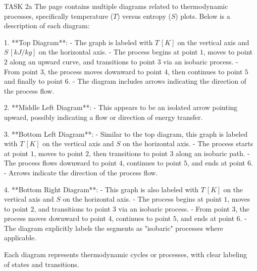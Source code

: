 TASK 2a  
The page contains multiple diagrams related to thermodynamic processes, specifically temperature (\( T \)) versus entropy (\( S \)) plots. Below is a description of each diagram:

1. **Top Diagram**:  
   - The graph is labeled with \( T \, [K] \) on the vertical axis and \( S \, [kJ/kg] \) on the horizontal axis.  
   - The process begins at point \( 1 \), moves to point \( 2 \) along an upward curve, and transitions to point \( 3 \) via an isobaric process.  
   - From point \( 3 \), the process moves downward to point \( 4 \), then continues to point \( 5 \) and finally to point \( 6 \).  
   - The diagram includes arrows indicating the direction of the process flow.  

2. **Middle Left Diagram**:  
   - This appears to be an isolated arrow pointing upward, possibly indicating a flow or direction of energy transfer.  

3. **Bottom Left Diagram**:  
   - Similar to the top diagram, this graph is labeled with \( T \, [K] \) on the vertical axis and \( S \) on the horizontal axis.  
   - The process starts at point \( 1 \), moves to point \( 2 \), then transitions to point \( 3 \) along an isobaric path.  
   - The process flows downward to point \( 4 \), continues to point \( 5 \), and ends at point \( 6 \).  
   - Arrows indicate the direction of the process flow.  

4. **Bottom Right Diagram**:  
   - This graph is also labeled with \( T \, [K] \) on the vertical axis and \( S \) on the horizontal axis.  
   - The process begins at point \( 1 \), moves to point \( 2 \), and transitions to point \( 3 \) via an isobaric process.  
   - From point \( 3 \), the process moves downward to point \( 4 \), continues to point \( 5 \), and ends at point \( 6 \).  
   - The diagram explicitly labels the segments as "isobaric" processes where applicable.  

Each diagram represents thermodynamic cycles or processes, with clear labeling of states and transitions.